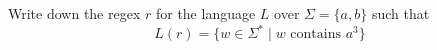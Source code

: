 Write down the regex $r$ for the language $L$ over $\Sigma = \{a, b\}$ 
such that 
\[
L(r) = \{w \in \Sigma^* \mid w \text{ contains $a^3$} \}
\]
